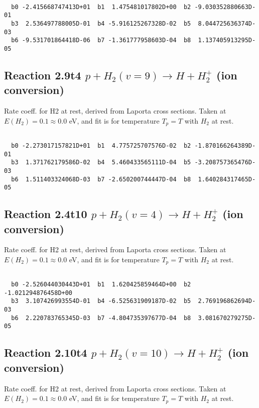\begin{small}\begin{verbatim}

  b0 -2.415668747413D+01  b1  1.475481017802D+00  b2 -9.030352880663D-01
  b3  2.536497788005D-01  b4 -5.916125267328D-02  b5  8.044725636374D-03
  b6 -9.531701864418D-06  b7 -1.361777958603D-04  b8  1.137405913295D-05

\end{verbatim}\end{small}

\newpage
\subsection{
Reaction 2.9t4
$ p + H_2(v=9) \rightarrow H + H_2^+$ (ion conversion)
}
Rate coeff. for H2 at rest, derived from Laporta cross sections.
Taken at $E(H_2) = 0.1 \approx 0.0$ eV,  and fit is for temperature $T_p=T$ with $H_2$ at rest.

\begin{small}\begin{verbatim}

  b0 -2.273017157821D+01  b1  4.775725707576D-02  b2 -1.870166264389D-01
  b3  1.371762179586D-02  b4  5.460433565111D-04  b5 -3.208757365476D-03
  b6  1.511403324068D-03  b7 -2.650200744447D-04  b8  1.640284317465D-05

\end{verbatim}\end{small}

\newpage
\subsection{
Reaction 2.4t10
$ p + H_2(v=4) \rightarrow H + H_2^+$ (ion conversion)
}
Rate coeff. for H2 at rest, derived from Laporta cross sections.
Taken at $E(H_2) = 0.1 \approx 0.0$ eV,  and fit is for temperature $T_p=T$ with $H_2$ at rest.

\begin{small}\begin{verbatim}

  b0 -2.526044030443D+01  b1  1.620425859464D+00  b2 -1.021294876458D+00
  b3  3.107426993554D-01  b4 -6.525631909187D-02  b5  2.769196862694D-03
  b6  2.220783765345D-03  b7 -4.804735397677D-04  b8  3.081670279275D-05

\end{verbatim}\end{small}

\newpage
\subsection{
Reaction 2.10t4
$ p + H_2(v=10) \rightarrow H + H_2^+$ (ion conversion)
}
Rate coeff. for H2 at rest, derived from Laporta cross sections.
Taken at $E(H_2) = 0.1 \approx 0.0$ eV,  and fit is for temperature $T_p=T$ with $H_2$ at rest.

